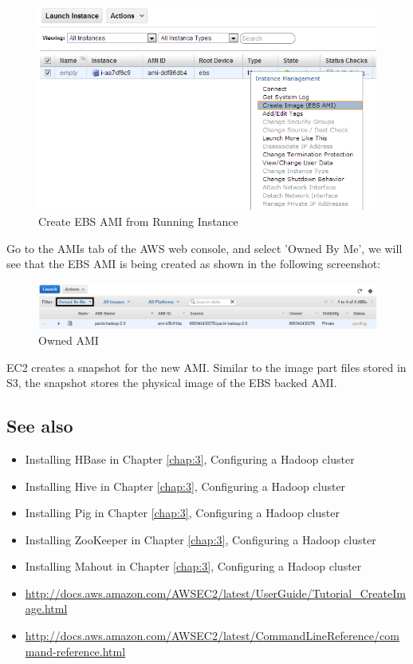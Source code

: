 \begin{figure}[ht]
  \centering
  \includegraphics[width=.9\textwidth]{figs/5163os_08_31.png}
  \caption{Create EBS AMI from Running Instance}\label{fig:aws.create.ebsami}
\end{figure} 
Go to the AMIs tab of the AWS web console, and select 'Owned By Me', we will see that the EBS AMI is being created as shown in the following screenshot:
\begin{figure}[ht]
  \centering
  \includegraphics[width=.9\textwidth]{figs/5163os_08_33.png}
  \caption{Owned AMI}\label{fig:aws.owned.ami}
\end{figure} 
EC2 creates a snapshot for the new AMI. Similar to the image part files stored in S3, the snapshot stores the physical image of the EBS backed AMI.

\subsection*{See also}
\begin{itemize}
  \item Installing HBase in Chapter \ref{chap:3}, Configuring a Hadoop cluster
  \item Installing Hive in Chapter \ref{chap:3}, Configuring a Hadoop cluster
  \item Installing Pig in Chapter \ref{chap:3}, Configuring a Hadoop cluster
  \item Installing ZooKeeper in Chapter \ref{chap:3}, Configuring a Hadoop cluster
  \item Installing Mahout in Chapter \ref{chap:3}, Configuring a Hadoop cluster
  \item \url{http://docs.aws.amazon.com/AWSEC2/latest/UserGuide/Tutorial_CreateImage.html}
  \item \url{http://docs.aws.amazon.com/AWSEC2/latest/CommandLineReference/command-reference.html}
\end{itemize}

